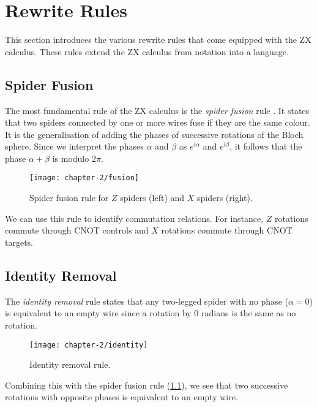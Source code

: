\section{Rewrite Rules}

This section introduces the various rewrite rules that come equipped with the ZX calculus. These rules extend the ZX calculus from notation into a language.

\subsection{Spider Fusion}%
\label{spider-fusion}

The most fundamental rule of the ZX calculus is the \textit{spider fusion} rule \cite{Wetering2020}. It states that two spiders connected by one or more wires fuse if they are the same colour. It is the generalisation of adding the phases of successive rotations of the Bloch sphere. Since we interpret the phases $\alpha$ and $\beta$ as $e^{i\alpha}$ and $e^{i\beta}$, it follows that the phase $\alpha + \beta$ is modulo $2\pi$.

\begin{figure}[H]
    \centering
    \texttt{[image: chapter-2/fusion]}
    \caption{Spider fusion rule for $Z$ spiders (left) and $X$ spiders (right).}
\end{figure}

We can use this rule to identify commutation relations. For instance, $Z$ rotations commute through CNOT controls and $X$ rotations commute through CNOT targets.



\subsection{Identity Removal}%
\label{identity}

The \textit{identity removal} rule states that any two-legged spider with no phase ($\alpha = 0$) is equivalent to an empty wire since a rotation by 0 radians is the same as no rotation.

\begin{figure}[H]
    \centering
    \texttt{[image: chapter-2/identity]}
    \caption{Identity removal rule.}
\end{figure}

Combining this with the spider fusion rule (\ref{spider-fusion}), we see that two successive rotations with opposite phases is equivalent to an empty wire.

